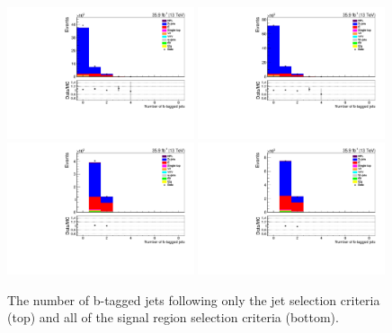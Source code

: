 \begin{figure}[ht]
\centering
\includegraphics[width=0.49\textwidth]{figs/background-estimation/plots/unblinded/prompt_ee_ttbarInc/numbBJets_NPL_ee_jetSel_ee.pdf}
\includegraphics[width=0.49\textwidth]{figs/background-estimation/plots/unblinded/prompt_mumu_ttbarInc/numbBJets_NPL_mumu_jetSel_mumu.pdf}
\\
\includegraphics[width=0.49\textwidth]{figs/background-estimation/plots/unblinded/prompt_ee_ttbarInc/numbBJets_NPL_ee_wMass_ee.pdf}
\includegraphics[width=0.49\textwidth]{figs/background-estimation/plots/unblinded/prompt_mumu_ttbarInc/numbBJets_NPL_mumu_wMass_mumu.pdf}
\caption{
The number of b-tagged jets following only the jet selection criteria (top) and all of the signal region selection criteria (bottom).
}
\label{fig:App_SR_nBJets}
\end{figure}

